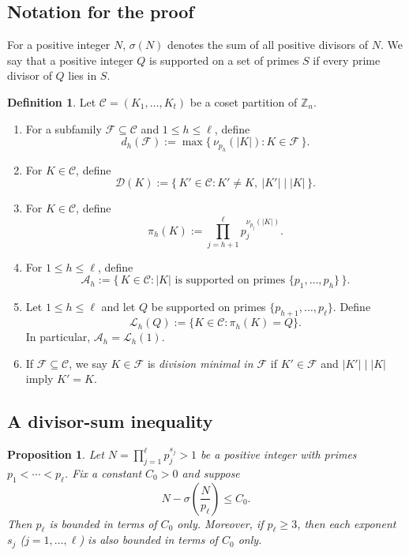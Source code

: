 \documentclass[11pt,reqno]{amsart}
\newtheorem{proposition}[theorem]{Proposition}
\theoremstyle{definition}
\newtheorem{definition}[theorem]{Definition}
\newcommand{\Z}{\mathbb{Z}}
\newcommand{\Cset}{\mathcal{C}}
\newcommand{\Aset}{\mathcal{A}}
\newcommand{\Lset}{\mathcal{L}}
\newcommand{\Dset}{\mathcal{D}}
\begin{document}
\subsection{Notation for the proof}
For a positive integer \(N\), \(\sigma(N)\) denotes the sum of all positive divisors of \(N\). We say that a positive integer \(Q\) is supported on a set of primes \(S\) if every prime divisor of \(Q\) lies in \(S\).


\begin{definition}\label{def:symbols}
Let \(\Cset=(K_1,\dots,K_t)\) be a coset partition of \(\Z_n\).
\begin{enumerate}[label=(\roman*)]
\item For a subfamily \(\mathcal{F}\subseteq \Cset\) and \(1\le h\le \ell\), define
\[
d_h(\mathcal{F}) := \max\{\,\nu_{p_h}(|K|): K\in\mathcal{F}\,\}.
\]
\item For \(K\in\Cset\), define
\[
\Dset(K):=\{\,K'\in \Cset: K'\neq K,\ |K'|\mid |K|\,\}.
\]
\item For \(K\in\Cset\), define
\[
\pi_h(K):=\prod_{j=h+1}^{\ell} p_j^{\nu_{p_j}(|K|)}.
\]
\item For \(1\le h\le \ell\), define
\[
\Aset_h
:=\{\,K\in\Cset:|K|\text{ is supported on primes 
}\{p_1,\dots,p_h\}\,\}.
\]
\item Let \(1\le h\le \ell\) and let \(Q\) be supported on primes \(\{p_{h+1},\dots,p_\ell\}\).
Define
\[
\Lset_h(Q)
:=\{K\in\Cset:\pi_h(K) = Q \}.
\]
In particular, \(\Aset_h=\Lset_h(1)\).
\item If \(\mathcal{F}\subseteq \Cset\), we say \(K\in\mathcal{F}\) is \emph{division minimal in \(\mathcal{F}\)} if
\(K'\in\mathcal{F}\) and \(|K'|\mid |K|\) imply \(K'=K\).
\end{enumerate}
\end{definition}

\subsection{A divisor-sum inequality}

\begin{proposition}\label{prop:largest-prime}
Let \(N=\prod_{j=1}^{\ell} p_j^{s_j} > 1\) be a positive integer with primes \( p_1<\cdots<p_\ell \).
Fix a constant \(C_0>0\) and suppose
\begin{equation}\label{eq:assump}
  N-\sigma\!\left(\frac{N}{p_\ell}\right)\le C_0 .
\end{equation}
Then \(p_\ell\) is bounded in terms of \(C_0\) only. Moreover, if \(p_\ell\ge 3\), then each
exponent \(s_j\) (\(j = 1, \ldots,\ell\)) is also bounded in terms of \(C_0\) only.
\end{proposition}
\end{document}

